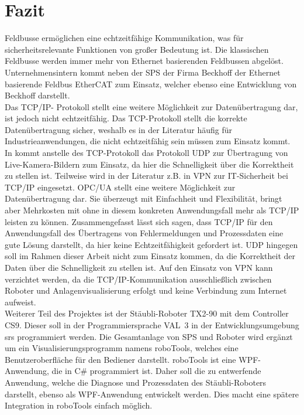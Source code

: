 \documentclass[ a4paper,
                oneside,
                toc=bibliography,
                toc=listof
                ]{scrbook}
\begin{document}
   	
   	\section{Fazit}
   	Feldbusse ermöglichen eine echtzeitfähige Kommunikation, was für sicherheitsrelevante Funktionen von großer Bedeutung ist. Die klassischen Feldbusse werden immer mehr von Ethernet basierenden Feldbussen abgelöst. Unternehmensintern kommt neben der SPS der Firma Beckhoff der Ethernet basierende Feldbus EtherCAT zum Einsatz, welcher ebenso eine Entwicklung von Beckhoff darstellt.\\
   	Das TCP/IP- Protokoll stellt eine weitere Möglichkeit zur Datenübertragung dar, ist jedoch nicht echtzeitfähig. Das TCP-Protokoll stellt die korrekte Datenübertragung sicher, weshalb es in der Literatur häufig für Industrieanwendungen, die nicht echtzeitfähig sein müssen zum Einsatz kommt.
   	In \cite{groza2008using} kommt anstelle des TCP-Protokoll das Protokoll UDP zur Übertragung von Live-Kamera-Bildern zum Einsatz, da hier die Schnelligkeit über die Korrektheit zu stellen ist. Teilweise wird in der Literatur z.B. in \cite{groza2008using} VPN zur IT-Sicherheit bei TCP/IP eingesetzt. OPC/UA stellt eine weitere Möglichkeit zur Datenübertragung dar. Sie überzeugt mit Einfachheit und Flexibilität, bringt aber Mehrkosten mit ohne in diesem konkreten Anwendungsfall mehr als TCP/IP leisten zu können. Zusammengefasst lässt sich sagen, dass TCP/IP für den Anwendungsfall des Übertragens von Fehlermeldungen und Prozessdaten eine gute Lösung darstellt, da hier keine Echtzeitfähigkeit gefordert ist. UDP hingegen soll im Rahmen dieser Arbeit nicht zum Einsatz kommen, da die Korrektheit der Daten über die Schnelligkeit zu stellen ist. Auf den Einsatz von VPN kann verzichtet werden, da die TCP/IP-Kommunikation ausschließlich zwischen Roboter und Anlagenvisualisierung erfolgt und keine Verbindung zum Internet aufweist.\\
   	Weiterer Teil des Projektes ist der Stäubli-Roboter TX2-90 mit dem Controller CS9. Dieser soll in der Programmiersprache VAL~3 in der Entwicklungsumgebung \acl{srs} programmiert werden. Die Gesamtanlage von SPS und Roboter wird ergänzt um ein Visualisierungsprogramm namens roboTools, welches eine Benutzeroberfläche für den Bediener darstellt. roboTools ist eine WPF-Anwendung, die in C\# programmiert ist. Daher soll die zu entwerfende Anwendung, welche die Diagnose und Prozessdaten des Stäubli-Roboters darstellt, ebenso als WPF-Anwendung entwickelt werden. Dies macht eine spätere Integration in roboTools einfach möglich.
   	
\end{document}
